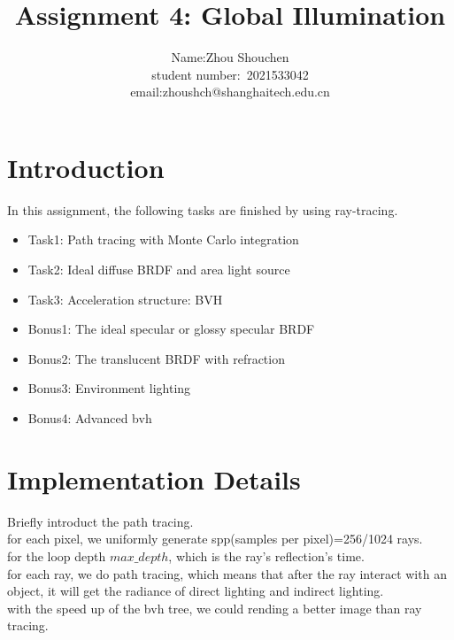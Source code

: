 \documentclass[acmtog]{acmart}
\title{Assignment 4: {Global Illumination}}
\author{Name:\quad Zhou Shouchen  \\ student number:\ 2021533042
\\email:\quad zhoushch@shanghaitech.edu.cn}
\begin{document}
\maketitle

\vspace*{2 ex}

\section{Introduction}
In this assignment, the following tasks are finished by using ray-tracing.
\begin{itemize}
\item Task1: Path tracing with Monte Carlo integration
\item Task2: Ideal diffuse BRDF and area light source
\item Task3: Acceleration structure: BVH
\item Bonus1: The ideal specular or glossy specular BRDF
\item Bonus2: The translucent BRDF with refraction
\item Bonus3: Environment lighting
\item Bonus4: Advanced bvh
\end{itemize}

\section{Implementation Details}
Briefly introduct the path tracing.\\
for each pixel, we uniformly generate spp(samples per pixel)=256/1024 rays.\\
for the loop depth $max\_depth$, which is the ray's reflection's time.\\ 
for each ray, we do path tracing, which means that after the ray interact with an object, 
it will get the radiance of direct lighting and indirect lighting.\\
with the speed up of the bvh tree, we could rending a better image than ray tracing.\\
\end{document}
